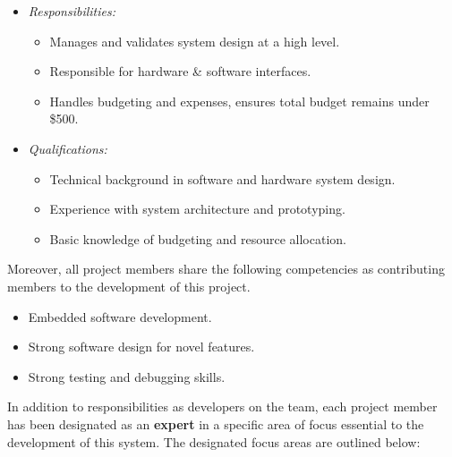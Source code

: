 \documentclass[12pt]{article}
\theoremstyle{definition}
\begin{document}
\begin{itemize}
\begin{itemize}
      \item \textit{Responsibilities:}
        \begin{itemize}
          \item Manages and validates system design at a high level. 
          \item Responsible for hardware \& software interfaces.
          \item Handles budgeting and expenses, ensures total budget remains
          under \$500.
        \end{itemize}
      \item \textit{Qualifications:}
        \begin{itemize}
          \item Technical background in software and hardware system design. 
          \item Experience with system architecture and prototyping.  
          \item Basic knowledge of budgeting and resource allocation. 
        \end{itemize}
    \end{itemize}
\end{itemize}


Moreover, all project members share the following competencies as contributing
members to the development of this project. 
\begin{itemize}
  \item Embedded software development.
  \item Strong software design for novel features. 
  \item Strong testing and debugging skills. 
\end{itemize}

In addition to responsibilities as developers on the team, each project member
has been designated as an \textbf{expert} in a specific area of focus essential
to the development of this system. The designated focus areas are outlined
below:
\end{document}

